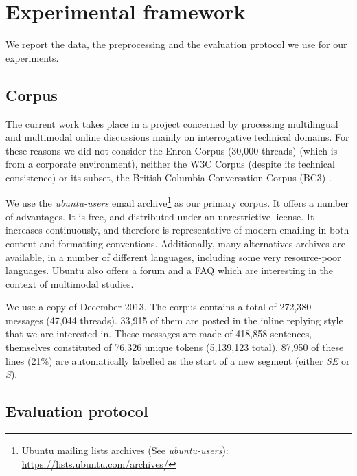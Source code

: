 \section{Experimental framework}
\label{sec:experimentalframework}
We report the data, the preprocessing and the evaluation protocol we use for our experiments.

\subsection{Corpus}

The current work takes place in a project concerned by processing multilingual and multimodal online discussions mainly on interrogative technical domains. 
For these reasons we did not consider the Enron Corpus (30,000 threads) \cite{klimt:2004:enron} (which is from a corporate environment), 
neither the W3C Corpus (despite its technical consistence) or its subset, the British Columbia Conversation Corpus (BC3) \cite{ulrich:2008:bc3}.

We use the \textit{ubuntu-users} email archive\footnote{Ubuntu mailing lists archives (See \textit{ubuntu-users}): \url{https://lists.ubuntu.com/archives/}} as our primary corpus. It offers a number of advantages. It is free, and distributed under an unrestrictive license. It increases continuously, and therefore is representative of modern emailing in both content and formatting conventions. Additionally, many alternatives archives are available, in a number of different languages, including some very resource-poor languages. Ubuntu also offers a forum and a FAQ which are interesting in the context of multimodal studies. 

We use a copy of December 2013.
The corpus contains a total of 272,380 messages (47,044 threads). 33,915 of them are posted in the inline replying style that we are interested in. These messages are made of 418,858 sentences, themselves constituted of 76,326 unique tokens (5,139,123 total). 87,950 of these lines (21\%) are automatically labelled as the start of a new segment (either \textit{SE} or \textit{S}).
\subsection{Evaluation protocol}

